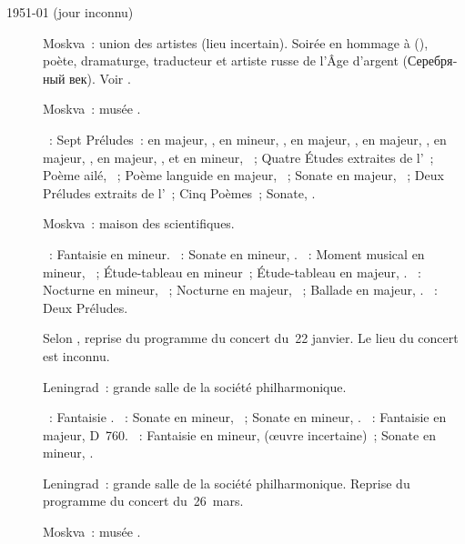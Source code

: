 \begin{description}
 \item[1951-01 (jour inconnu)]
 Moskva~: union des artistes (lieu incertain).
 Soirée en hommage à \KLipskerov{} (), poète, dramaturge,
 traducteur et artiste russe de l'Âge d'argent
 (\foreignlanguage{russian}{Серебряный век}).
 Voir \citet[p.~171]{Nekrasova08}.
 \item[]
 Moskva~: musée \Scriabine{}.

 \textsc{\Scriabine{}}~: Sept Préludes~: en \kD \Flat majeur, 
 , en \kB \Flat mineur,  , en \kF \Sharp
 majeur,  , en \kB majeur,  , en \kD
 majeur,  , en \kG majeur,  , et en
 \kF \Sharp mineur,  ~; Quatre Études extraites de
 l'~; Poème ailé,  ~; Poème languide en \kB
 majeur,  ~; Sonate en \kF \Sharp majeur, ~;
 Deux Préludes extraits de l'~; Cinq Poèmes~; Sonate, .
 \item[]
 Moskva~: maison des scientifiques.

 \textsc{\Mozart{}}~: Fantaisie en \kC mineur.
 \textsc{\Beethoven{}}~: Sonate en \kF mineur, .
 \textsc{\Rachmaninov{}}~: Moment musical en \kE \Flat mineur, 
 ~; Étude-tableau en \kC mineur~; Étude-tableau en \kE \Flat
 majeur,  .
 \textsc{\Chopin{}}~: Nocturne en \kC mineur,  ~;
 Nocturne en \kE \Flat majeur,  ~; Ballade en \kA \Flat
 majeur, .
 \textsc{\Scriabine{}}~: Deux Préludes.
 \item[]
 Selon \ASofronitsky{}, reprise du programme du concert du~22 janvier.
 Le lieu du concert est inconnu.
 \item[]
 Leningrad~: grande salle de la société philharmonique.

 \textsc{\Mozart{}}~: Fantaisie .
 \textsc{\Beethoven{}}~: Sonate en \kC \Sharp mineur,  ~;
 Sonate en \kC mineur, .
 \textsc{\Schubert{}}~: Fantaisie  en \kC majeur, D~760.
 \textsc{\Chopin{}}~: Fantaisie en \kF mineur,  (œuvre
 incertaine)~; Sonate en \kB \Flat mineur, .
 \item[]
 Leningrad~: grande salle de la société philharmonique.
 Reprise du programme du concert du~26~mars.
 \item[]
 Moskva~: musée \Scriabine{}.


\end{description}
